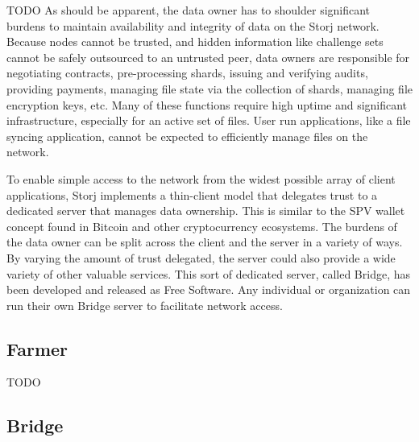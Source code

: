 \documentclass[a4paper,10pt]{article}
\newcommand{\todo}[1]{{\color{red} TODO #1}}
\begin{document}
\todo{
As should be apparent, the data owner has to shoulder significant burdens to
maintain availability and integrity of data on the Storj network. Because nodes
cannot be trusted, and hidden information like challenge sets cannot be safely
outsourced to an untrusted peer, data owners are responsible for negotiating
contracts, pre-processing shards, issuing and verifying audits, providing
payments, managing file state via the collection of shards, managing file
encryption keys, etc. Many of these functions require high uptime and
significant infrastructure, especially for an active set of files. User run
applications, like a file syncing application, cannot be expected to efficiently
manage files on the network.

To enable simple access to the network from the widest possible array of client
applications, Storj implements a thin-client model that delegates trust to a
dedicated server that manages data ownership. This is similar to the SPV wallet
concept found in Bitcoin and other cryptocurrency ecosystems. The burdens of the
data owner can be split across the client and the server in a variety of ways.
By varying the amount of trust delegated, the server could also provide a wide
variety of other valuable services. This sort of dedicated server, called
Bridge, has been developed and released as Free Software. Any individual or
organization can run their own Bridge server to facilitate network access.
}

\subsection{Farmer}

\todo{}

\subsection{Bridge}
\end{document}

